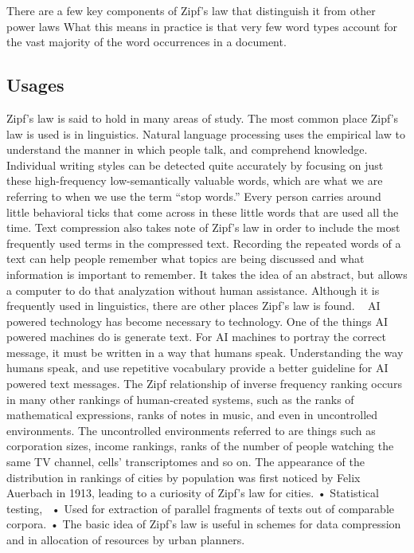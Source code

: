 \documentclass[a4paper,10pt]{article}
\begin{document}
There are a few key components of Zipf’s law that distinguish it from other power laws
What this means in practice is that very few word types account for the vast majority of the word occurrences in a document. 

	

\subsection{Usages}

Zipf's law is said to hold in many areas of study. The most common place Zipf's law is used is in linguistics. Natural language processing uses the empirical law to understand the manner in which people talk, and comprehend knowledge. Individual writing styles can be detected quite accurately by focusing on just these high-frequency low-semantically valuable words, which are what we are referring to when we use the term “stop words.”  Every person carries around little behavioral ticks that come across in these little words that are used all the time.  Text compression also takes note of Zipf's law in order to include the most frequently used terms in the compressed text. Recording the repeated words of a text can help people remember what topics are being discussed and what information is important to remember. It takes the idea of an abstract, but allows a computer to do that analyzation without human assistance. Although it is frequently used in linguistics, there are other places Zipf's law is found.  
AI powered technology has become necessary to technology. One of the things AI powered machines do is generate text. For AI machines to portray the correct message, it must be written in a way that humans speak. Understanding the way humans speak, and use repetitive vocabulary provide a better guideline for AI powered text messages. 
The Zipf relationship of inverse frequency ranking occurs in many other rankings of human-created systems, such as the ranks of mathematical expressions, ranks of notes in music, and even in uncontrolled environments. The uncontrolled environments referred to are things such as corporation sizes, income rankings, ranks of the number of people watching the same TV channel, cells' transcriptomes  and so on. The appearance of the distribution in rankings of cities by population was first noticed by Felix Auerbach in 1913, leading to a curiosity of Zipf's law for cities. 
• Statistical testing, 
• Used for extraction of parallel fragments of texts out of comparable corpora. 
• The basic idea of Zipf’s law is useful in schemes for data compression and in allocation of resources by urban planners.
	
\end{document}
